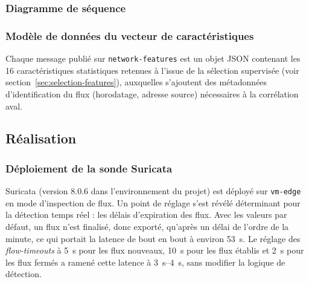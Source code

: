 
\subsubsection{Diagramme de séquence}


\subsubsection{Modèle de données du vecteur de caractéristiques}

Chaque message publié sur \texttt{network-features} est un objet JSON contenant les 16 caractéristiques statistiques retenues à l'issue de la sélection supervisée (voir section~\ref{sec:selection-features}), auxquelles s'ajoutent des métadonnées d'identification du flux (horodatage, adresse source) nécessaires à la corrélation aval.



\subsection{Réalisation}

\subsubsection{Déploiement de la sonde Suricata}

Suricata (version 8.0.6 dans l'environnement du projet) est déployé sur \texttt{vm-edge} en mode d'inspection de flux. Un point de réglage s'est révélé déterminant pour la détection temps réel : les délais d'expiration des flux. Avec les valeurs par défaut, un flux n'est finalisé, donc exporté, qu'après un délai de l'ordre de la minute, ce qui portait la latence de bout en bout à environ \SI{53}{\second}. Le réglage des \emph{flow-timeouts} à \SI{5}{\second} pour les flux nouveaux, \SI{10}{\second} pour les flux établis et \SI{2}{\second} pour les flux fermés a ramené cette latence à \SIrange{3}{4}{\second}, sans modifier la logique de détection.

